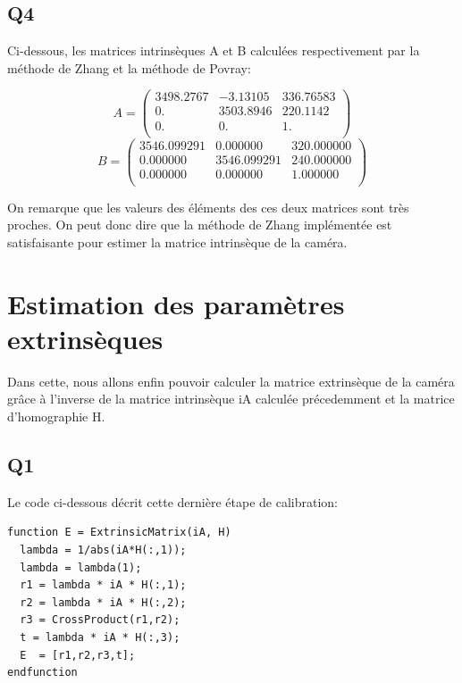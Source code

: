 \documentclass[a4paper,12pt]{report}
\begin{document}
\subsection*{Q4}
Ci-dessous, les matrices intrinsèques A et B calculées respectivement par la méthode de Zhang et la méthode de Povray:\\
\begin{center}
\[
	A=\left (
	\begin{array}{ccc}
		3498.2767 & - 3.13105  &  336.76583 \\  
        0.        &  3503.8946 & 220.1142 \\   
        0.        &   0.     &      1.       \\
	\end{array}
	\right )	
\]
\[
	B=\left (
	\begin{array}{ccc}
		3546.099291 & 0.000000    & 320.000000    \\
		0.000000    & 3546.099291 & 240.000000   \\
		0.000000    & 0.000000    & 1.000000    \\
	\end{array}
	\right )
\]
\end{center}
On remarque que les valeurs des éléments des ces deux matrices sont très proches. On peut donc dire que la méthode de Zhang implémentée est satisfaisante pour estimer la matrice intrinsèque de la caméra.

\section*{Estimation des paramètres extrinsèques}
Dans cette, nous allons enfin pouvoir calculer la matrice extrinsèque de la caméra grâce à l'inverse de la matrice intrinsèque iA calculée précedemment et la matrice d'homographie H. 
\subsection*{Q1}
Le code ci-dessous décrit cette dernière étape de calibration:
\begin{lstlisting}[style=Scilab]
function E = ExtrinsicMatrix(iA, H)
  lambda = 1/abs(iA*H(:,1));
  lambda = lambda(1);
  r1 = lambda * iA * H(:,1);
  r2 = lambda * iA * H(:,2);
  r3 = CrossProduct(r1,r2);
  t = lambda * iA * H(:,3);
  E  = [r1,r2,r3,t]; 
endfunction
\end{lstlisting}
\end{document}
